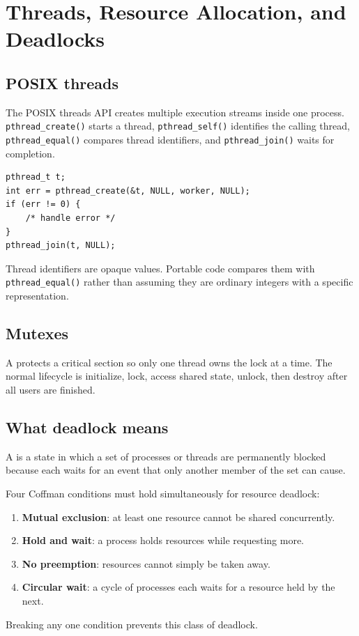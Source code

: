 \chapter{Threads, Resource Allocation, and Deadlocks}\label{ch:deadlock}

\section{POSIX threads}
The POSIX threads API creates multiple execution streams inside one process. \texttt{pthread\_create()} starts a thread, \texttt{pthread\_self()} identifies the calling thread, \texttt{pthread\_equal()} compares thread identifiers, and \texttt{pthread\_join()} waits for completion.

\begin{lstlisting}[style=osc]
pthread_t t;
int err = pthread_create(&t, NULL, worker, NULL);
if (err != 0) {
    /* handle error */
}
pthread_join(t, NULL);
\end{lstlisting}

\begin{pitfall}
Thread identifiers are opaque values. Portable code compares them with \texttt{pthread\_equal()} rather than assuming they are ordinary integers with a specific representation.
\end{pitfall}

\section{Mutexes}
A  protects a critical section so only one thread owns the lock at a time. The normal lifecycle is initialize, lock, access shared state, unlock, then destroy after all users are finished.

\section{What deadlock means}
A  is a state in which a set of processes or threads are permanently blocked because each waits for an event that only another member of the set can cause.

Four Coffman conditions must hold simultaneously for resource deadlock:
\begin{enumerate}
  \item \textbf{Mutual exclusion}: at least one resource cannot be shared concurrently.
  \item \textbf{Hold and wait}: a process holds resources while requesting more.
  \item \textbf{No preemption}: resources cannot simply be taken away.
  \item \textbf{Circular wait}: a cycle of processes each waits for a resource held by the next.
\end{enumerate}
Breaking any one condition prevents this class of deadlock.

